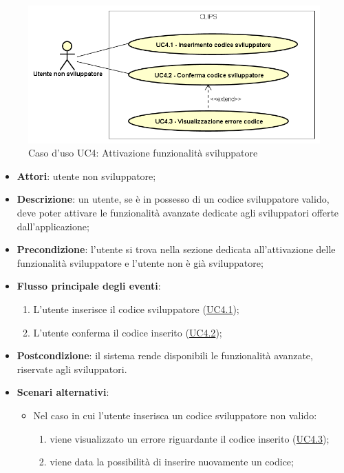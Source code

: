 \documentclass[../AnalisiDeiRequisiti.tex]{subfiles}
\begin{document}
\begin{figure}[H]
	\centering
	\includegraphics[scale=0.95, width=\textwidth]{img/UC4.png}
	\caption{Caso d'uso UC4: Attivazione funzionalità sviluppatore}\label{fig:UC4} 
\end{figure}
\begin{itemize}
	\item \textbf{Attori}: utente non sviluppatore;
	\item \textbf{Descrizione}: un utente, se è in possesso di un codice sviluppatore valido, deve poter attivare le funzionalità avanzate dedicate agli sviluppatori offerte dall'applicazione; 
	\item \textbf{Precondizione}: l'utente si trova nella sezione dedicata all'attivazione delle funzionalità sviluppatore e l'utente non è già sviluppatore;
	
	\item \textbf{Flusso principale degli eventi}:
	\begin{enumerate}
		\item L'utente inserisce il codice sviluppatore (\hyperlink{UC4.1}{UC4.1});
		\item L'utente conferma il codice inserito (\hyperlink{UC4.2}{UC4.2});
		
	\end{enumerate}
	\item \textbf{Postcondizione}: il sistema rende disponibili le funzionalità avanzate, riservate agli sviluppatori.
	\item \textbf{Scenari alternativi}: 
	\begin{itemize}
		\item Nel caso in cui l'utente inserisca un codice sviluppatore non valido: 
		\begin{enumerate}
			\item viene visualizzato un errore riguardante il codice inserito (\hyperlink{UC4.3}{UC4.3});
			\item viene data la possibilità di inserire nuovamente un codice;
		\end{enumerate}
	\end{itemize}
\end{itemize}
\hypertarget{UC4.1}{}
\end{document}
